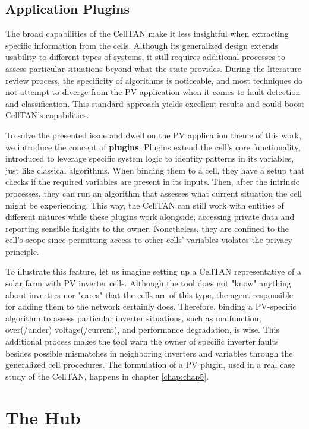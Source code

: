 \subsection{Application Plugins} \label{subsec:plugins}


The broad capabilities of the CellTAN make it less insightful when extracting specific information from the cells. Although its generalized design extends usability to different types of systems, it still requires additional processes to assess particular situations beyond what the state provides. During the literature review process, the specificity of algorithms is noticeable, and most techniques do not attempt to diverge from the PV application when it comes to fault detection and classification. This standard approach yields excellent results and could boost CellTAN's capabilities.

To solve the presented issue and dwell on the PV application theme of this work, we introduce the concept of \textbf{plugins}. Plugins extend the cell's core functionality, introduced to leverage specific system logic to identify patterns in its variables, just like classical algorithms. When binding them to a cell, they have a setup that checks if the required variables are present in its inputs. Then, after the intrinsic processes, they can run an algorithm that assesses what current situation the cell might be experiencing. This way, the CellTAN can still work with entities of different natures while these plugins work alongside, accessing private data and reporting sensible insights to the owner. Nonetheless, they are confined to the cell's scope since permitting access to other cells' variables violates the privacy principle.

To illustrate this feature, let us imagine setting up a CellTAN representative of a solar farm with PV inverter cells. Although the tool does not "know" anything about inverters nor "cares" that the cells are of this type, the agent responsible for adding them to the network certainly does. Therefore, binding a PV-specific algorithm to assess particular inverter situations, such as malfunction, over(/under) voltage(/current), and performance degradation, is wise. This additional process makes the tool warn the owner of specific inverter faults besides possible mismatches in neighboring inverters and variables through the generalized cell procedures. The formulation of a PV plugin, used in a real case study of the CellTAN, happens in chapter \ref{chap:chap5}.

\section{The Hub}

